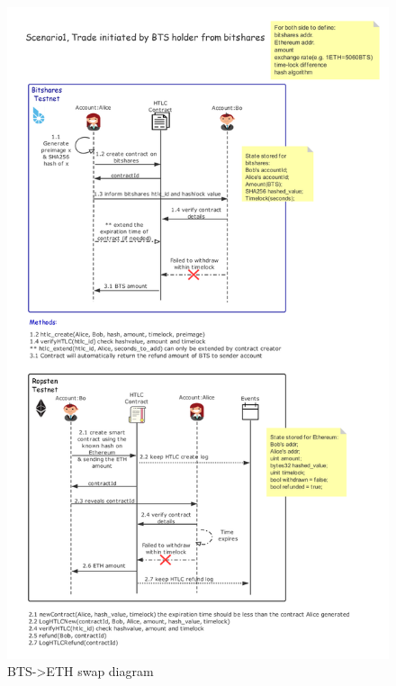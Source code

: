 \begin{figure}[H]
	\includegraphics[width=1\textwidth]{./figures/BTS-ETH_diagram_failed}
        \centering
        \caption{BTS->ETH swap diagram}
        \centering
        \label{fig:failed}

\end{figure}


